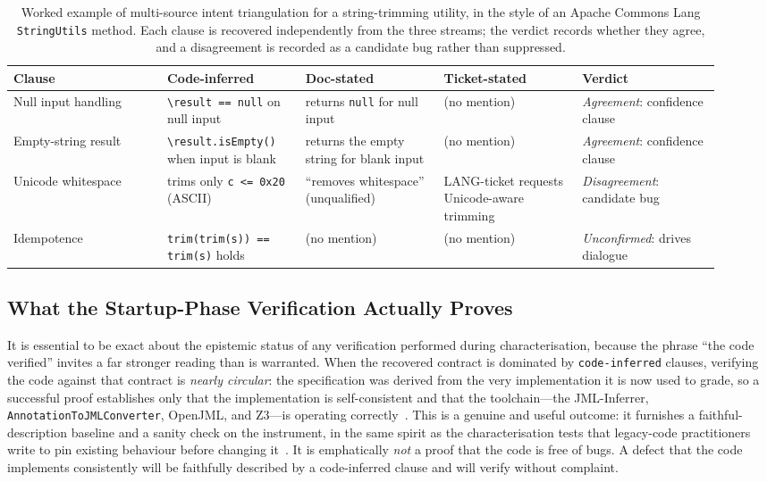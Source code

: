 \begin{table}[t]
\centering
\caption{Worked example of multi-source intent triangulation for a string-trimming utility, in the style of an Apache Commons Lang \texttt{StringUtils} method. Each clause is recovered independently from the three streams; the verdict records whether they agree, and a disagreement is recorded as a candidate bug rather than suppressed.}
\label{tab:bf-triangulation}
\small
\begin{tabular}{@{}p{0.20\linewidth}p{0.18\linewidth}p{0.18\linewidth}p{0.18\linewidth}p{0.18\linewidth}@{}}
\toprule
\textbf{Clause} & \textbf{Code-inferred} & \textbf{Doc-stated} & \textbf{Ticket-stated} & \textbf{Verdict} \\
\midrule
Null input handling &
\texttt{\textbackslash result == null} on null input &
returns \texttt{null} for null input &
(no mention) &
\emph{Agreement}: confidence clause \\[2pt]
Empty-string result &
\texttt{\textbackslash result.isEmpty()} when input is blank &
returns the empty string for blank input &
(no mention) &
\emph{Agreement}: confidence clause \\[2pt]
Unicode whitespace &
trims only \texttt{c <= 0x20} (ASCII) &
``removes whitespace'' (unqualified) &
LANG-ticket requests Unicode-aware trimming &
\emph{Disagreement}: candidate bug \\[2pt]
Idempotence &
\texttt{trim(trim(s)) == trim(s)} holds &
(no mention) &
(no mention) &
\emph{Unconfirmed}: drives dialogue \\
\bottomrule
\end{tabular}
\end{table}

\subsection{What the Startup-Phase Verification Actually Proves}
\label{subsec:bf-proves}

It is essential to be exact about the epistemic status of any verification performed during characterisation, because the phrase ``the code verified'' invites a far stronger reading than is warranted. When the recovered contract is dominated by \texttt{code-inferred} clauses, verifying the code against that contract is \emph{nearly circular}: the specification was derived from the very implementation it is now used to grade, so a successful proof establishes only that the implementation is self-consistent and that the toolchain---the JML-Inferrer, \texttt{AnnotationToJMLConverter}, OpenJML, and Z3---is operating correctly~\cite{cok2014openjml,demoura2008z3}. This is a genuine and useful outcome: it furnishes a faithful-description baseline and a sanity check on the instrument, in the same spirit as the characterisation tests that legacy-code practitioners write to pin existing behaviour before changing it~\cite{feathers2004legacy}. It is emphatically \emph{not} a proof that the code is free of bugs. A defect that the code implements consistently will be faithfully described by a code-inferred clause and will verify without complaint.

